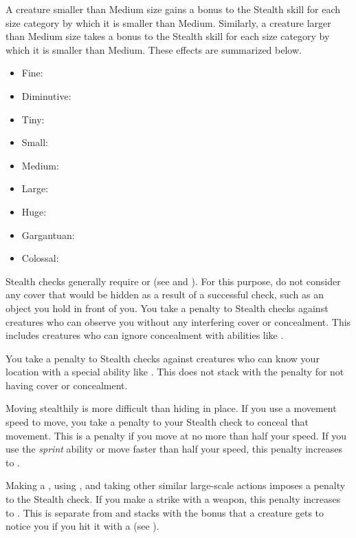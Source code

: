     A creature smaller than Medium size gains a  bonus to the Stealth skill for each size category by which it is smaller than Medium.
    Similarly, a creature larger than Medium size takes a  bonus to the Stealth skill for each size category by which it is smaller than Medium.
    These effects are summarized below.
    \begin{itemize}
      \item Fine: 
      \item Diminutive: 
      \item Tiny: 
      \item Small: 
      \item Medium: 
      \item Large: 
      \item Huge: 
      \item Gargantuan: 
      \item Colossal: 
    \end{itemize}

    Stealth checks generally require  or  (see  and ).
    For this purpose, do not consider any cover that would be hidden as a result of a successful check, such as an object you hold in front of you.
    You take a  penalty to Stealth checks against creatures who can observe you without any interfering cover or concealment.
    This includes creatures who can ignore concealment with abilities like .

    You take a  penalty to Stealth checks against creatures who can know your location with a special ability like .
    This does not stack with the penalty for not having cover or concealment.

    Moving stealthily is more difficult than hiding in place.
    If you use a movement speed to move, you take a penalty to your Stealth check to conceal that movement.
    This is a  penalty if you move at no more than half your speed.
    If you use the \textit{sprint} ability or move faster than half your speed, this penalty increases to .

    Making a , using , and taking other similar large-scale actions imposes a  penalty to the Stealth check.
    If you make a strike with a  weapon, this penalty increases to .
    This is separate from and stacks with the  bonus that a creature gets to notice you if you hit it with a  (see ).

